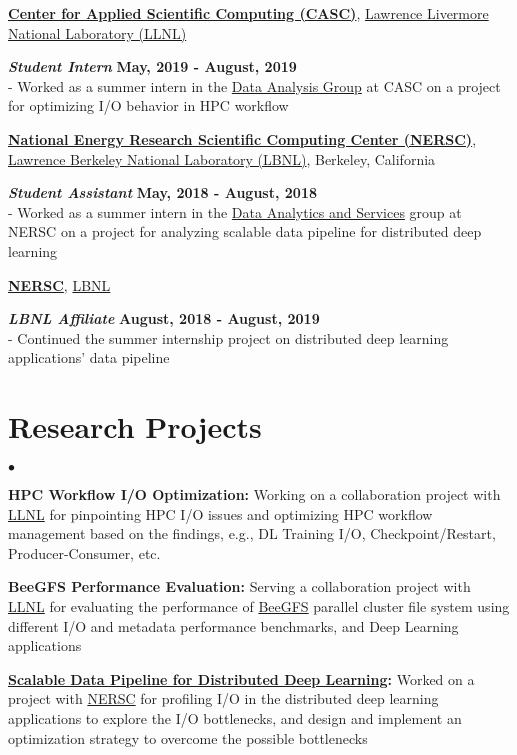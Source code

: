 \documentclass[margin,line]{res}
\newenvironment{list2}{
  \begin{list}{$\bullet$}{%
      \setlength{\itemsep}{0in}
      \setlength{\parsep}{0in} \setlength{\parskip}{0in}
      \setlength{\topsep}{0in} \setlength{\partopsep}{0in} 
      \setlength{\leftmargin}{0.2in}}}{\end{list}}
\begin{document}
\begin{resume}
\vspace{-.3cm}
{\bf \href{https://computing.llnl.gov/casc}{Center for Applied Scientific Computing (CASC)}}, \href{http://www.llnl.gov/}{Lawrence Livermore National Laboratory (LLNL)}

\vspace{-.4cm}
\textbf{{\em Student Intern}} \hfill {\bf May, 2019 - August, 2019}\\
- Worked as a summer intern in the \href{https://computing.llnl.gov/casc/data-analysis-group}{Data Analysis Group} at CASC on a project for optimizing I/O behavior in HPC workflow

\vspace{-.3cm}
{\bf \href{http://www.nersc.gov/}{National Energy Research Scientific Computing Center (NERSC)}}, \href{http://www.lbl.gov/}{Lawrence Berkeley National Laboratory (LBNL)}, Berkeley, California

\vspace{-.4cm}
\textbf{{\em Student Assistant}} \hfill {\bf May, 2018 - August, 2018}\\
- Worked as a summer intern in the \href{http://www.nersc.gov/users/data-analytics/}{Data Analytics and Services} group at NERSC on a project for analyzing scalable data pipeline for distributed deep learning

\vspace{-.3cm}
{\bf \href{http://www.nersc.gov/}{NERSC}}, \href{http://www.lbl.gov/}{LBNL}

\vspace{-.4cm}
\textbf{{\em LBNL Affiliate}} \hfill {\bf August, 2018 - August, 2019}\\
- Continued the summer internship project on distributed deep learning applications' data pipeline

\vspace*{-.1in}

\section{\sc Research Projects}
\begin{list2}
\item {\bf HPC Workflow I/O Optimization:} Working on a collaboration project with \href{https://www.llnl.gov/}{LLNL} for pinpointing HPC I/O issues and optimizing HPC workflow management based on the findings, e.g., DL Training I/O, Checkpoint/Restart, Producer-Consumer, etc.
\item {\bf BeeGFS Performance Evaluation:} Serving a collaboration project with \href{https://www.llnl.gov/}{LLNL} for evaluating the performance of \href{https://www.beegfs.io/content/}{BeeGFS} parallel cluster file system using different I/O and metadata performance benchmarks, and Deep Learning applications
\item {\bf \href{https://github.com/NERSC/DL-Parallel-IO}{Scalable Data Pipeline for Distributed Deep Learning}:} Worked on a project with \href{http://www.nersc.gov/}{NERSC} for profiling I/O in the distributed deep learning applications to explore the I/O bottlenecks, and design and implement an optimization strategy to overcome the possible bottlenecks
\end{list2}


\end{resume}
\end{document}
